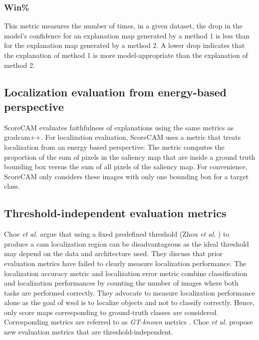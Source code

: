 \subsubsection{Win\%}
This metric measures the number of times, in a given dataset, the drop in the model's confidence for an explanation map generated by a method 1 is less than for the explanation map generated by a method 2. A lower drop indicates that the explanation of method 1 is more model-appropriate than the explanation of method 2.

\subsection{Localization evaluation from energy-based perspective}
ScoreCAM evaluates faithfulness of explanations using the same metrics as \acrshort{gradcam}++. For localization evaluation, ScoreCAM uses a metric that treats localization from an energy based perspective: The metric computes the proportion of the sum of pixels in the saliency map that are inside a ground truth bounding box versus the sum of all pixels of the saliency map. For convenience, ScoreCAM only considers these images with only one bounding box for a target class.

\subsection{Threshold-independent evaluation metrics}
Choe \textit{et al.} \cite{choe2020evaluating, choe2022evaluation} argue that using a fixed predefined threshold (Zhou \textit{et al.} \cite{zhou2016cvpr}) to produce a \acrshort{cam} localization region can be disadvantageous as the ideal threshold may depend on the data and architecture used. They discuss that prior evaluation metrics have failed to clearly measure localization performance. The localization accuracy metric \cite{russakovsky2015imagenet} and localization error \cite{zhou2016cvpr, selvaraju2017grad} metric combine classification and localization performances by counting the number of images where both tasks are performed correctly. They advocate to measure localization performance alone as the goal of \acrshort{wsol} is to localize objects and not to classify correctly. Hence, only score maps corresponding to ground-truth classes are considered. Corresponding metrics are referred to as \textit{GT-known} metrics \cite{choe2019attention, singh2017hide, zhang2018adversarial, zhang2018self}. Choe \textit{et al.} propose new evaluation metrics that are threshold-independent.


